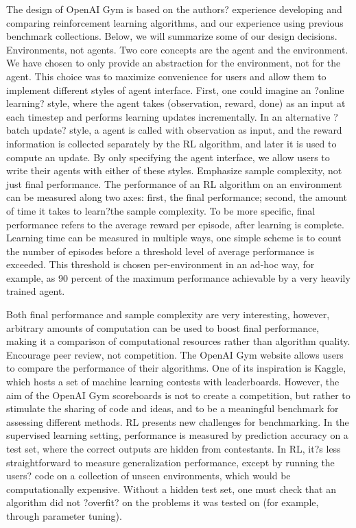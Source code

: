 The design of OpenAI Gym is based on the authors? experience developing and comparing reinforcement learning algorithms, and our experience using previous benchmark collections. Below, we will summarize some of our design decisions.
Environments, not agents. Two core concepts are the agent and the environment. We have chosen to only provide an abstraction for the environment, not for the agent. This choice was to maximize convenience for users and allow them to implement different styles of agent interface. First, one could imagine an ?online learning? style, where the agent takes (observation, reward, done) as an input at each timestep and performs learning updates incrementally. In an alternative ?batch update? style, a agent is called with observation as input, and the reward information is collected separately by the RL algorithm, and later it is used to compute an update. By only specifying the agent interface, we allow users to write their agents with either of these styles.
Emphasize sample complexity, not just final performance. The performance of an RL algorithm on an environment can be measured along two axes: first, the final performance; second, the amount of time it takes to learn?the sample complexity. To be more specific, final performance refers to the average reward per episode, after learning is complete. Learning time can be measured in multiple ways, one simple scheme is to count the number of episodes before a threshold level of average performance is exceeded. This threshold is chosen per-environment in an ad-hoc way, for example, as 90 percent of the maximum performance achievable by a very heavily trained agent.

Both final performance and sample complexity are very interesting, however, arbitrary amounts of computation can be used to boost final performance, making it a comparison of computational resources rather than algorithm quality.
Encourage peer review, not competition. The OpenAI Gym website allows users to compare the performance of their algorithms. One of its inspiration is Kaggle, which hosts a set of machine learning contests with leaderboards. However, the aim of the OpenAI Gym scoreboards is not to create a competition, but rather to stimulate the sharing of code and ideas, and to be a meaningful benchmark for assessing different methods.
RL presents new challenges for benchmarking. In the supervised learning setting, performance is measured by prediction accuracy on a test set, where the correct outputs are hidden from contestants. In RL, it?s less straightforward to measure generalization performance, except by running the users? code on a collection of unseen environments, which would be computationally expensive. Without a hidden test set, one must check that an algorithm did not ?overfit? on the problems it was tested on (for example, through parameter tuning).

